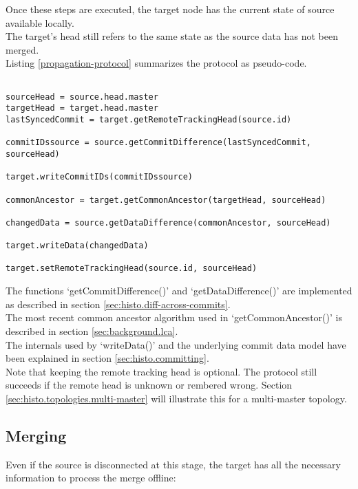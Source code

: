 Once these steps are executed, the target node has the current state of source available locally.\\
The target's head still refers to the same state as the source data has not been merged.\\

Listing \ref{propagation-protocol} summarizes the protocol as pseudo-code.\\

\begin{lstlisting}[caption=Detecting updates across nodes and propagating the changes., label=propagation-protocol]

sourceHead = source.head.master
targetHead = target.head.master
lastSyncedCommit = target.getRemoteTrackingHead(source.id)

commitIDssource = source.getCommitDifference(lastSyncedCommit, sourceHead)

target.writeCommitIDs(commitIDssource)

commonAncestor = target.getCommonAncestor(targetHead, sourceHead)

changedData = source.getDataDifference(commonAncestor, sourceHead)

target.writeData(changedData)

target.setRemoteTrackingHead(source.id, sourceHead)

\end{lstlisting}

The functions `getCommitDifference()' and `getDataDifference()' are implemented as described in section \ref{sec:histo.diff-across-commits}.\\
The most recent common ancestor algorithm used in `getCommonAncestor()' is described in section \ref{sec:background.lca}.\\
The internals used by `writeData()' and the underlying commit data model have been explained in section \ref{sec:histo.committing}.\\
Note that keeping the remote tracking head is optional.
The protocol still succeeds if the remote head is unknown or rembered wrong.
Section \ref{sec:histo.topologies.multi-master} will illustrate this for a multi-master topology. 

\subsection{Merging}
\label{sec:histo.protocol.merging}
Even if the source is disconnected at this stage, the target has all the necessary information to process the merge offline:\\

